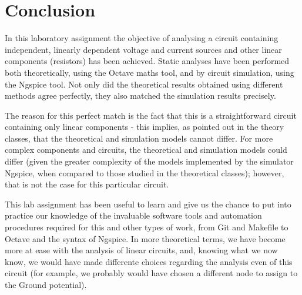 \section{Conclusion}
\label{sec:conclusion}

In this laboratory assignment the objective of analysing a circuit containing independent, linearly dependent voltage and current sources and other linear components (resistors) has been
achieved. Static analyses have been performed both
theoretically, using the Octave maths tool, and by circuit simulation, using the
Ngspice tool. Not only did the theoretical results obtained using different methods agree perfectly, they also matched the simulation results precisely.\par
The reason for this perfect match is the fact that this is a
straightforward circuit containing only linear components - this implies, as pointed out in the theory classes, that the theoretical
and simulation models cannot differ. For more complex components and circuits, the
theoretical and simulation models could differ (given the greater complexity of the models implemented by the simulator Ngspice, when compared to those studied in the theoretical classes); however, that is not the case for this particular circuit.\par
This lab assignment has been useful to learn and give us the chance to put into practice our knowledge of the invaluable software tools and automation procedures required for this and other types of work, from Git and Makefile to Octave and the syntax of Ngspice. In more theoretical terms, we have become more at ease with the analysis of linear circuits, and, knowing what we now know, we would have made differente choices regarding the analysis even of this circuit (for example, we probably would have chosen a different node to assign to the Ground potential).

